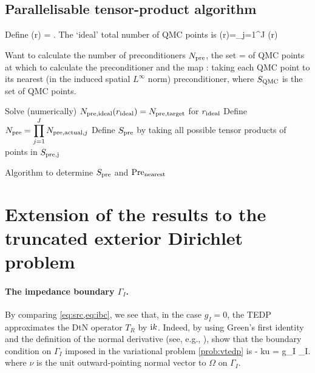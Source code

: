 \subsection{Parallelisable tensor-product algorithm}
Define
\beqs
\Npreidealj(r) = \max{}.
\eeqs
The `ideal' total number of QMC points is
\beqs
\Npreideal(r)=\prod_{j=1}^J  \Npreidealj(r)
\eeqs

Want to calculate the number of preconditioners $N_{\mathrm{pre}}$, the set
\beqs
\Spre=\set{\ypreo,\ldots,\ypreNpre}
\eeqs
of QMC points at which to calculate the preconditioner and the map
\beqs
\nearestpre:\SQMC\rightarrow\Spre
\eeqs
taking each QMC point to its nearest (in the induced spatial $L^\infty$ norm) preconditioner, where $S_{\mathrm{QMC}}$ is the set of QMC points.

\begin{algorithm}[h]
\DontPrintSemicolon
{}

\Input{$\Npretarget \in \NN$}
\Output{$\Spre$, $\nearestpre$}
\BlankLine
Solve (numerically) $N_{\mathrm{pre,ideal}}(r_{\mathrm{ideal}}) = N_{\mathrm{pre,target}}$ for $r_{\mathrm{ideal}}$\;
Define $\displaystyle N_{\mathrm{pre}} = \prod_{j=1}^J N_{\mathrm{pre,actual},j}$\;
Define $\Spre$ by taking all possible tensor products of points in $S_{\mathrm{pre,j}}$\;
\caption{Algorithm to determine $\Spre$ and $\nearestpre$}
\end{algorithm}

\section{Extension of the results to the truncated exterior Dirichlet problem}\label{sec:TEDP}

\paragraph{The impedance boundary $\Gamma_I$.} By comparing \cref{eq:src,eq:ibc}, we see that, in the case $g_I=0$, the TEDP approximates the DtN operator $T_R$ by $\mathrm{i} k$. Indeed, by using Green's first identity and the definition of the normal derivative (see, e.g., \cite[Lemma 4.3]{Mc:00}), show that the boundary condition on $\Gamma_I$ imposed in the variational problem \cref{prob:vtedp} is 
\beq\label{eq:imp}
\dudnu - \ri k\gamma u = g_I \ton \Gamma_I.
\eeq
where $\nu$ is the unit outward-pointing normal vector to $\Omega$ on $\Gamma_I$.


